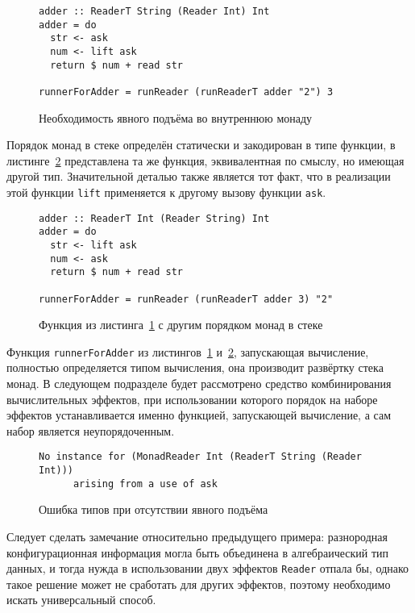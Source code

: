 \begin{figure}[t]
\begin{lstlisting}
adder :: ReaderT String (Reader Int) Int
adder = do
  str <- ask
  num <- lift ask
  return $ num + read str

runnerForAdder = runReader (runReaderT adder "2") 3
\end{lstlisting}
\caption{Необходимость явного подъёма во внутреннюю монаду}
\label{listing:mtlReadersLift}
\end{figure}

Порядок монад в стеке определён статически и закодирован в типе функции,
в листинге~\ref{listing:mtlDifferentReadersLift} представлена та же функция,
эквивалентная по смыслу, но имеющая другой тип. Значительной деталью также
является тот факт, что в реализации этой функции \lstinline{lift} применяется
к другому вызову функции \lstinline{ask}.

\begin{figure}[t]
\begin{lstlisting}
adder :: ReaderT Int (Reader String) Int
adder = do
  str <- lift ask
  num <- ask
  return $ num + read str

runnerForAdder = runReader (runReaderT adder 3) "2"
\end{lstlisting}
\caption{Функция из листинга~\ref{listing:mtlReadersLift} с другим порядком монад в стеке}
\label{listing:mtlDifferentReadersLift}
\end{figure}

Функция \lstinline{runnerForAdder} из листингов~\ref{listing:mtlReadersLift}
и~\ref{listing:mtlDifferentReadersLift}, запускающая вычисление, полностью
определяется типом вычисления, она производит развёртку стека монад.
В следующем подразделе будет рассмотрено средство комбинирования вычислительных
эффектов, при использовании которого порядок на наборе эффектов устанавливается
именно функцией, запускающей вычисление, а сам набор является неупорядоченным.

\begin{figure}[t]
\begin{lstlisting}
No instance for (MonadReader Int (ReaderT String (Reader Int)))
      arising from a use of ask
\end{lstlisting}
\caption{Ошибка типов при отсутствии явного подъёма}
\label{listing:mtlCompileError}
\end{figure}

Следует сделать замечание относительно предыдущего примера: разнородная
конфигурационная информация могла быть объединена в алгебраический тип данных,
и тогда нужда в использовании двух эффектов \lstinline{Reader} отпала бы,
однако такое решение может не сработать для других эффектов, поэтому необходимо
искать универсальный способ.

